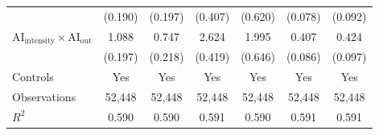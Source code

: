 \begin{table}[H]
\begin{threeparttable}
\begin{tabular}{l*{6}{c}}
            &     (0.190)         &     (0.197)         &     (0.407)         &     (0.620)         &     (0.078)         &     (0.092)         \\
$\mathrm{AI}_{\text{intensity}} \times \mathrm{AI}_{\text{out}}$&       1.088\sym{***}&       0.747\sym{***}&       2.624\sym{***}&       1.995\sym{***}&       0.407\sym{***}&       0.424\sym{***}\\
            &     (0.197)         &     (0.218)         &     (0.419)         &     (0.646)         &     (0.086)         &     (0.097)         \\
\midrule
Controls    &         Yes         &         Yes         &         Yes         &         Yes         &         Yes         &         Yes         \\
Observations&      52,448         &      52,448         &      52,448         &      52,448         &      52,448         &      52,448         \\
$R^2$       &       0.590         &       0.590         &       0.591         &       0.590         &       0.591         &       0.591         \\
\bottomrule\bottomrule
\end{tabular}
\end{threeparttable}
\end{table}
